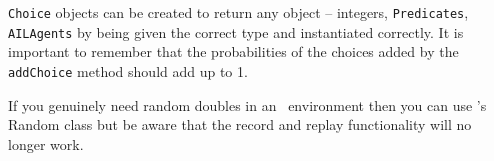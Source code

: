 \documentclass[a4]{article}
\begin{document}
\texttt{Choice} objects can be created to return any object -- integers, \texttt{Predicates}, \texttt{AILAgents} by being given the correct type and instantiated correctly.  It is important to remember that the probabilities of the choices added by the \texttt{addChoice} method should add up to 1.

If you genuinely need random doubles in an \ail\ environment then you can use \java's Random class but be aware that the record and replay functionality will no longer work.
\end{document}
